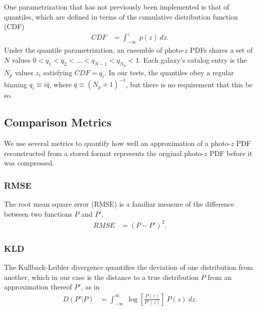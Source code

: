 \documentclass[\docopts]{\docclass}
\begin{document}
One parametrization that has not previously been implemented is that of 
quantiles, which are defined in terms of the cumulative distribution function 
(CDF)
\begin{align}
  \label{eq:cdf}
  CDF &= \int_{-\infty}^{z}\ p(z)\ dz.
\end{align}
Under the quantile parametrization, an ensemble of photo-$z$ PDFs shares a set 
of $N$ values $0<q_{1}<q_{2}<\dots<q_{N-1}<q_{N_{p}}<1$.  Each galaxy's catalog 
entry is the $N_{p}$ values $z_{i}$ satisfying $CDF=q_{i}$.  In our tests, the 
quantiles obey a regular binning $q_{i}\equiv i\bar{q}$, where 
$\bar{q}\equiv(N_{p}+1)^{-1}$, but there is no requirement that this be so.

\subsection{Comparison Metrics}
\label{sec:metrics}


We use several metrics to quantify how well an approximation of a photo-$z$ PDF 
reconstructed from a stored format represents the original photo-$z$ PDF before 
it was compressed.



\subsubsection{RMSE}
\label{sec:rms}

The root mean square error (RMSE) is a familiar measure of the difference 
between two functions $P$ and $P'$,
\begin{align}
  \label{eq:rmse}
  RMSE &= (P - P')^{2}.
\end{align}

\subsubsection{KLD}
\label{sec:kld}

The Kullback-Leibler divergence quantifies the deviation of one distribution 
from another, which in our case is the distance to a true distribution $P$ from 
an approximation thereof $P'$, as in
\begin{align}
  \label{eq:kld}
  D(P' | P) &= \int_{-\infty}^{\infty}\ \log\left[\frac{P(z)}{P'(z)}\right]\ 
P(z)\ dz.
\end{align}
\end{document}
